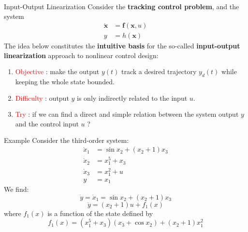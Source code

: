 \documentclass{beamer}
\renewcommand{\vec}[1]{\ensuremath{\boldsymbol{#1}}} %
\begin{document}


\begin{frame}{Input-Output Linearization}
Consider the \textbf{tracking control problem}, and the system
    \begin{equation}\label{tracking-control}
      \begin{aligned}
        \dot{\vec{x}} &= \vec{f}(\vec{x}, u) \\
        y &= h(\vec{x})
      \end{aligned}
    \end{equation}
The idea below constitutes the \textbf{intuitive basis} for the so-called \textbf{input-output linearization} approach to nonlinear control design:
    \begin{enumerate}
      \item \textcolor{red}{Objective} : make the output $y(t)$ track a desired trajectory $y_{d}(t)$ while keeping the whole state bounded.
      \item \textcolor{red}{Difficulty} : output $y$ is only indirectly related to the input $u$.
      \item \textcolor{red}{Try} : if we can find a direct and simple relation between the system output $y$ and the control input $u$ ?
    \end{enumerate}
\end{frame}


\begin{frame}{Example}
Consider the third-order system:
    \begin{equation}\label{third-order}
      \begin{aligned}
        \dot{x}_{1} &= \sin x_{2}+(x_{2}+1)x_{3} \\
        \dot{x}_{2} &= x_{1}^{5}+x_{3} \\
        \dot{x}_{3} &= x_{1}^{2}+u \\
        y &= x_{1}
      \end{aligned}
    \end{equation}
We find:
    $$
    \dot{y}=\dot{x}_{1}=\sin x_{2}+\left(x_{2}+1\right) x_{3}
    $$
    \begin{equation}\label{double}
      \ddot{y}=\left(x_{2}+1\right) u+f_{1}(x)
    \end{equation}
where $f_{1}(x)$ is a function of the state defined by
    \begin{equation}\label{f1x}
        f_{1}(x)=\left(x_{1}^{5}+x_{3}\right)\left(x_{3}+\cos x_{2}\right)+\left(x_{2}+1\right) x_{1}^{2}
    \end{equation}
\end{frame}
\end{document}
